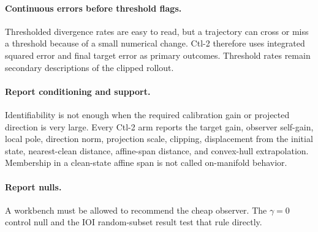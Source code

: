 \paragraph{Continuous errors before threshold flags.}
Thresholded divergence rates are easy to read, but a trajectory can cross or
miss a threshold because of a small numerical change. Ctl-2 therefore uses
integrated squared error and final target error as primary outcomes. Threshold
rates remain secondary descriptions of the clipped rollout.

\paragraph{Report conditioning and support.}
Identifiability is not enough when the required calibration gain or projected
direction is very large. Every Ctl-2 arm reports the target gain, observer
self-gain, local pole, direction norm, projection scale, clipping, displacement
from the initial state, nearest-clean distance, affine-span distance, and
convex-hull extrapolation. Membership in a clean-state affine span is not called
on-manifold behavior.

\paragraph{Report nulls.}
A workbench must be allowed to recommend the cheap observer. The $\gamma=0$
control null and the IOI random-subset result test that rule directly.
